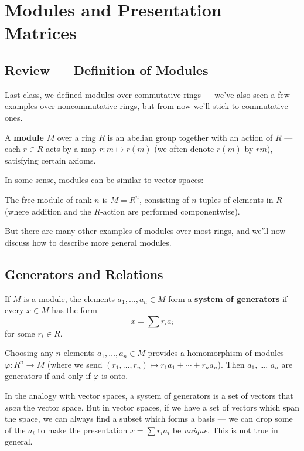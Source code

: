
\section{Modules and Presentation Matrices}

\subsection{Review --- Definition of Modules}

Last class, we defined modules over commutative rings --- we've also seen a few examples over noncommutative rings, but from now we'll stick to commutative ones. 

\begin{definition}
A \textbf{module} $M$ over a ring $R$ is an abelian group together with an action of $R$ --- each $r \in R$ acts by a map $r : m \mapsto r(m)$ (we often denote $r(m)$ by $rm$), satisfying certain axioms. 
\end{definition}

In some sense, modules can be similar to vector spaces: 

\begin{example}
The free module of rank $n$ is $M = R^n$, consisting of $n$-tuples of elements in $R$ (where addition and the $R$-action are performed componentwise). 
\end{example}

But there are many other examples of modules over most rings, and we'll now discuss how to describe more general modules. 

\subsection{Generators and Relations}

If $M$ is a module, the elements $a_1, \ldots, a_n \in M$ form a \textbf{system of generators} if every $x \in M$ has the form \[x = \sum r_i a_i\] for some $r_i \in R.$ 

Choosing any $n$ elements $a_1, \ldots, a_n \in M$ provides a homomorphism of modules 
$\varphi : R^n \to M$ (where we send $(r_1, \ldots, r_n) \mapsto r_1a_1 + \cdots + r_na_n$). Then $a_1$, \ldots, $a_n$ are generators if and only if $\varphi$ is onto. 

In the analogy with vector spaces, a system of generators is a set of vectors that \emph{span} the vector space. But in vector spaces, if we have a set of vectors which span the space, we can always find a subset which forms a basis --- we can drop some of the $a_i$ to make the presentation $x = \sum r_ia_i$ be \emph{unique}. This is not true in general. 

